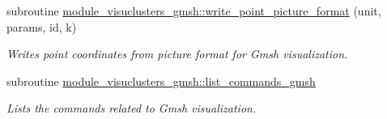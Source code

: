 \begin{DoxyCompactItemize}
subroutine \hyperlink{namespacemodule__visuclusters__gmsh_aa00f636e7ea0ae13557bdf9fa21b285f}{module\+\_\+visuclusters\+\_\+gmsh\+::write\+\_\+point\+\_\+picture\+\_\+format} (unit, params, id, k)
\begin{DoxyCompactList}\small\item\em Writes point coordinates from picture format for Gmsh visualization. \end{DoxyCompactList}\item 
subroutine \hyperlink{namespacemodule__visuclusters__gmsh_af4df8b9f65af2acfbc5489b6e299cfde}{module\+\_\+visuclusters\+\_\+gmsh\+::list\+\_\+commands\+\_\+gmsh}
\begin{DoxyCompactList}\small\item\em Lists the commands related to Gmsh visualization. \end{DoxyCompactList}\end{DoxyCompactItemize}

